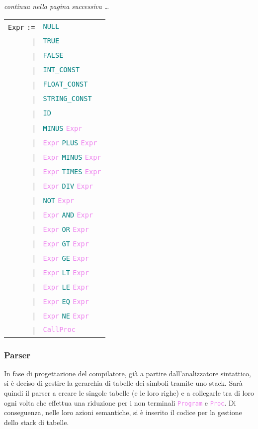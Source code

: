 \documentclass[a4paper,12pt]{article}
\newcommand\nonterm[1]{\texttt{\textcolor{violet}{#1}}}
\newcommand\term[1]{\texttt{\textcolor{teal}{#1}}}
\newcommand\production[1]{\texttt{#1} \texttt{:=}}
\begin{document}
   	\vspace{1.5cm}
	\begin{center}
		\textit{continua nella pagina successiva \dots}
	\end{center}
  \begin{tabular}{rl}
   \production{Expr}    & \term{NULL} \\
						|& \term{TRUE} \\
						|& \term{FALSE} \\
						|& \term{INT\_CONST} \\
						|& \term{FLOAT\_CONST} \\
						|& \term{STRING\_CONST} \\
						|& \term{ID} \\
    				                 |& \term{MINUS} \nonterm{Expr} \\
						|& \nonterm{Expr} \term{PLUS} \nonterm{Expr} \\
						|& \nonterm{Expr} \term{MINUS} \nonterm{Expr} \\ 
						|& \nonterm{Expr} \term{TIMES} \nonterm{Expr} \\
						|& \nonterm{Expr} \term{DIV} \nonterm{Expr} \\
    						|& \term{NOT} \nonterm{Expr} \\
						|& \nonterm{Expr} \term{AND} \nonterm{Expr} \\
						|& \nonterm{Expr} \term{OR} \nonterm{Expr} \\
						|& \nonterm{Expr} \term{GT} \nonterm{Expr} \\
						|& \nonterm{Expr} \term{GE} \nonterm{Expr} \\
						|& \nonterm{Expr} \term{LT} \nonterm{Expr} \\
						|& \nonterm{Expr} \term{LE} \nonterm{Expr} \\
						|& \nonterm{Expr} \term{EQ} \nonterm{Expr} \\
						|& \nonterm{Expr} \term{NE} \nonterm{Expr} \\
						|& \nonterm{CallProc} \\
    \end{tabular}

	\subsubsection{Parser}
	In fase di progettazione del compilatore, già a partire dall'analizzatore sintattico, si è deciso di gestire la 
	gerarchia di tabelle dei simboli tramite uno stack.
	Sarà quindi il parser a creare le singole tabelle (e le loro righe) e a collegarle tra di loro ogni volta che effettua una riduzione
	per i non terminali \nonterm{Program} e \nonterm{Proc}.
	Di conseguenza, nelle loro azioni semantiche, si è inserito il codice per la gestione dello stack di tabelle.
	
\end{document}
